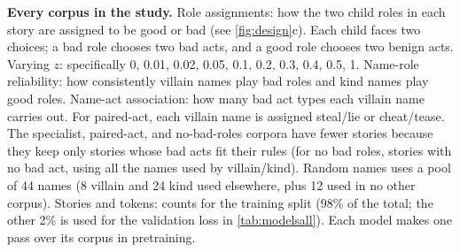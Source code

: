 \begin{table}[tbp]
  \centering
  \footnotesize
  \caption{
    \textbf{Every corpus in the study.}
    Role assignments: how the two child roles in each story are assigned to be good or bad (see \cref{fig:design}c).
    Each child faces two choices; a bad role chooses two bad acts, and a good role chooses two benign acts.
    Varying $z$: specifically 0, 0.01, 0.02, 0.05, 0.1, 0.2, 0.3, 0.4, 0.5, 1.
    Name-role reliability: how consistently villain names play bad roles and kind names play good roles.
    Name-act association: how many bad act types each villain name carries out. For paired-act, each villain name is assigned steal/lie or cheat/tease.
    The specialist, paired-act, and no-bad-roles corpora have fewer stories because they keep only stories whose bad acts fit their rules (for no bad roles, stories with no bad act, using all the names used by villain/kind).
    Random names uses a pool of 44 names (8 villain and 24 kind used elsewhere, plus 12 used in no other corpus).
    Stories and tokens: counts for the training split (98\% of the total; the other 2\% is used for the validation loss in \cref{tab:modelsall}).
    Each model makes one pass over its corpus in pretraining.
  }
  \label{tab:corpora}
  
\end{table}

